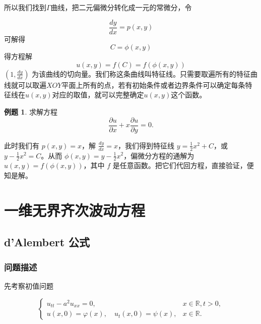 \documentclass[12pt,a4paper]{article}
\numberwithin{subsection}{section}   %
\numberwithin{subsubsection}{subsection}
\theoremstyle{plain}
\theoremstyle{definition}
\newtheorem{example}{例题}[subsection]  %
\theoremstyle{remark}
\theoremstyle{remark}
\begin{document}
	所以我们找到$\Gamma$曲线，把二元偏微分转化成一元的常微分，令
	
	\begin{equation}
		\frac{dy}{dx} = p(x, y)
	\end{equation}
	可解得
	\begin{equation}
		C=\phi(x,y)
	\end{equation}
	得方程解
	\begin{equation}
		u(x, y)=f(C)=f(\phi(x,y))
	\end{equation}
	$(1, \frac{dy}{dx})$
	为该曲线的切向量。我们称这条曲线叫特征线。只需要取遍所有的特征曲线就可以取遍$XOY$平面上所有的点，若有初始条件或者边界条件可以确定每条特征线在$u(x, y)$对应的取值，就可以完整确定$u(x, y)$这个函数。
	
	\begin{example}求解方程
		\begin{equation}
			\frac{\partial u}{\partial x} + x \frac{\partial u}{\partial y} = 0.
		\end{equation}
		
		此时我们有 $p(x, y) = x$，解 $\frac{dy}{dx} = x$，我们得到特征线 $y = \frac{1}{2}x^2 + C$，或 $y - \frac{1}{2}x^2 = C$。从而 $\phi(x, y) = y - \frac{1}{2}x^2$，偏微分方程的通解为 $u(x, y) = f(\phi(x, y))$，其中 $f$ 是任意函数。把它们代回方程，直接验证，便知是解。
	\end{example}
	
	\newpage
	
	\section{一维无界齐次波动方程}
	
	\subsection{d’Alembert 公式}
	
	\subsubsection{问题描述}
	先考察初值问题
	
	\begin{equation}\label{一维无界波动方程}
		\begin{cases}
			u_{tt} - a^2 u_{xx} = 0, & x \in \mathbb{R}, t > 0, \\
			u(x, 0) = \varphi(x), \quad u_t(x, 0) = \psi(x), & x \in \mathbb{R}.
		\end{cases}
	\end{equation}
	
\end{document}
